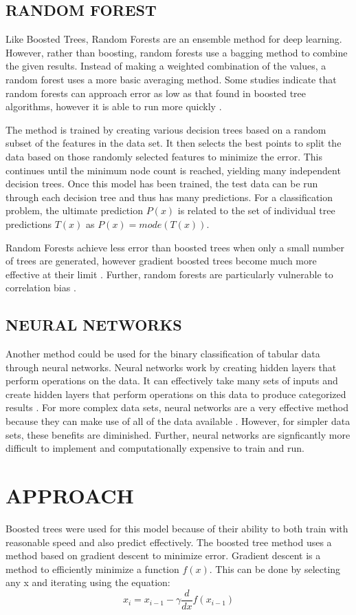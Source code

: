 \documentclass[12pt]{article}
\begin{document}
    \subsection{RANDOM FOREST}
      Like Boosted Trees, Random Forests are an ensemble method for deep learning. However, rather than boosting, random forests use a bagging method to combine the given results. Instead of making a weighted combination of the values, a random forest uses a more basic averaging method. Some studies indicate that random forests can approach error as low as that found in boosted tree algorithms, however it is able to run more quickly \cite{friedman2001elements}.

      The method is trained by creating various decision trees based on a random subset of the features in the data set. It then selects the best points to split the data based on those randomly selected features to minimize the error. This continues until the minimum node count is reached, yielding many independent decision trees. Once this model has been trained, the test data can be run through each decision tree and thus has many predictions. For a classification problem, the ultimate prediction $P(x)$ is related to the set of individual tree predictions $T(x)$ as $P(x) = mode(T(x))$.

      Random Forests achieve less error than boosted trees when only a small number of trees are generated, however gradient boosted trees become much more effective at their limit \cite{friedman2001elements}. Further, random forests are particularly vulnerable to correlation bias \cite{randomforest1}.

    \subsection{NEURAL NETWORKS}
      Another method could be used for the binary classification of tabular data through neural networks. Neural networks work by creating hidden layers that perform operations on the data. It can effectively take many sets of inputs and create hidden layers that perform operations on this data to produce categorized results \cite{neuralnets1}. For more complex data sets, neural networks are a very effective method because they can make use of all of the data available \cite{neuralnets2}. However, for simpler data sets, these benefits are diminished. Further, neural networks are signficantly more difficult to implement and computationally expensive to train and run.
  \section{APPROACH}
    Boosted trees were used for this model because of their ability to both train with reasonable speed and also predict effectively. The boosted tree method uses a method based on gradient descent to minimize error. Gradient descent is a method to efficiently minimize a function $f(x)$. This can be done by selecting any x and iterating using the equation:
   \begin{equation}
     x_i = x_{i-1} - \gamma\frac{d}{dx}f(x_{i-1})
   \end{equation}
\end{document}

